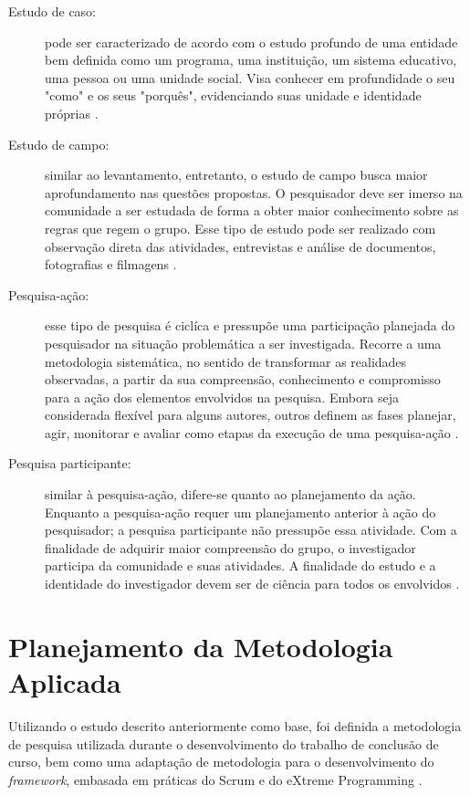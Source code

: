 \begin{description}
\item[Estudo de caso:] pode ser caracterizado de acordo com o estudo profundo de uma entidade bem definida como um programa, uma instituição, um sistema educativo, uma pessoa ou uma unidade social. Visa conhecer em profundidade o seu "como" e os seus "porquês", evidenciando suas unidade e identidade próprias \cite{prodanov2013}. 

\item[Estudo de campo:] similar ao levantamento, entretanto, o estudo de campo busca maior aprofundamento nas questões propostas. O pesquisador deve ser imerso na comunidade a ser estudada de forma a obter maior conhecimento sobre as regras que regem o grupo. Esse tipo de estudo pode ser realizado com observação direta das atividades, entrevistas e análise de documentos, fotografias e filmagens \cite{tafner2007}.

\item[Pesquisa-ação:] esse tipo de pesquisa é ciclíca e pressupõe uma participação planejada do pesquisador na situação problemática a ser investigada. Recorre a uma metodologia sistemática, no sentido de transformar as realidades observadas, a partir da sua compreensão, conhecimento e compromisso para a ação dos elementos envolvidos na pesquisa\cite{thiollent2009}. Embora seja considerada flexível para alguns autores, outros definem as fases planejar, agir, monitorar e avaliar como etapas da execução de uma pesquisa-ação \cite{ferreira2011}. 

\item[Pesquisa participante:] similar à pesquisa-ação, difere-se quanto ao planejamento da ação. Enquanto a pesquisa-ação requer um planejamento anterior à ação do pesquisador; a pesquisa participante não pressupõe essa atividade. Com a finalidade de adquirir maior compreensão do grupo, o investigador participa da comunidade e suas atividades. A finalidade do estudo e a identidade do investigador devem ser de ciência para todos os envolvidos \cite{tafner2007}.
\end{description}

 \section{Planejamento da Metodologia Aplicada}
  
Utilizando o estudo descrito anteriormente como base, foi definida a metodologia de pesquisa utilizada durante o desenvolvimento do trabalho de conclusão de curso, bem como uma adaptação de metodologia para o desenvolvimento do \textit{framework}, embasada em práticas do Scrum \cite{scrum2014} e do eXtreme Programming \cite{wells2009}.  
  
